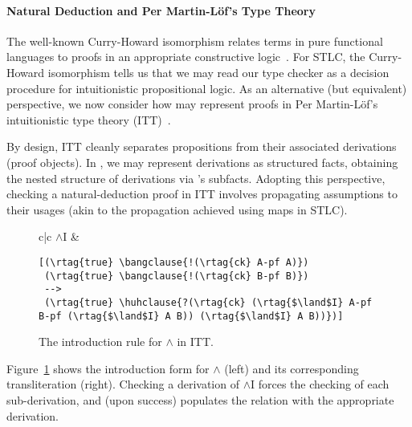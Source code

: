 \paragraph*{Natural Deduction and Per Martin-L\"of's Type Theory}

The well-known Curry-Howard isomorphism relates terms in pure
functional languages to proofs in an appropriate constructive
logic~\cite{Curry:1934}. For STLC, the Curry-Howard isomorphism tells
us that we may read our type checker as a decision procedure for
intuitionistic propositional logic. As an alternative (but equivalent)
perspective, we now consider how \slog{} may represent proofs in Per
Martin-L\"of's intuitionistic type theory (ITT)~\cite{Martin-Lof1996}.

By design, ITT cleanly separates propositions from their associated
derivations (proof objects). In \slog{}, we may represent derivations
as structured facts, obtaining the nested structure of derivations via
\slog{}'s subfacts. Adopting this perspective, checking a
natural-deduction proof in ITT involves propagating assumptions to
their usages (akin to the propagation achieved using maps in STLC).

\begin{figure}[h!]

\begin{tabular}{c|c}
{{\textsc{$\land$I}}} \quad& 
\begin{minipage}{2.5in}
{
\begin{Verbatim}[baselinestretch=.8,commandchars=\\\{\},codes={\catcode`$=3\catcode`^=7}]
[(\rtag{true} \bangclause{!(\rtag{ck} A-pf A)})
 (\rtag{true} \bangclause{!(\rtag{ck} B-pf B)})
 -->
 (\rtag{true} \huhclause{?(\rtag{ck} (\rtag{$\land$I} A-pf B-pf (\rtag{$\land$I} A B)) (\rtag{$\land$I} A B))})]
\end{Verbatim}
}
\end{minipage}
\end{tabular}
\caption{The introduction rule for $\land$ in ITT.}
\label{fig:itt}
\end{figure}

Figure~\ref{fig:itt} shows the introduction form for $\land$
(left) and its corresponding \slog{} transliteration (right). Checking
a derivation of $\land$I forces the checking of each sub-derivation,
and (upon success) populates the  relation with the
appropriate derivation.

